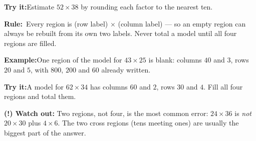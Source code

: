 \documentclass[12pt]{article}
\begin{document}
\begin{tryitbox}\textbf{Try it:}\quad Estimate $52 \times 38$ by rounding each
factor to the nearest ten.
\ \end{tryitbox}


\begin{formulabox}\textbf{Rule:}\ Every region is (row label) $\times$ (column
label) --- so an empty region can always be rebuilt from its own two labels.
Never total a model until all four regions are filled.
\end{formulabox}

\begin{examplebox}\textbf{Example:}\quad One region of the model for
$43 \times 25$ is blank: columns $40$ and $3$, rows $20$ and $5$, with $800$,
$200$ and $60$ already written.
\end{examplebox}

\begin{tryitbox}\textbf{Try it:}\quad A model for $62 \times 34$ has columns
$60$ and $2$, rows $30$ and $4$. Fill all four regions and total them.
\ \end{tryitbox}

\begin{watchoutbox}\textbf{(!) Watch out:} Two regions, not four, is the most
common error: $24 \times 36$ is \emph{not} $20 \times 30$ plus $4 \times 6$.
The two cross regions (tens meeting ones) are usually the biggest part of the
answer.
\end{watchoutbox}
\end{document}
